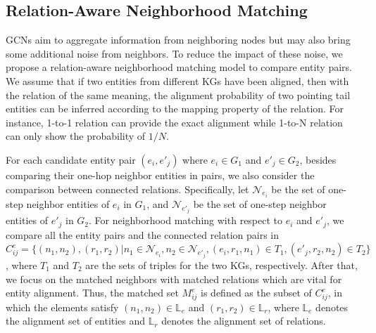 \documentclass[letterpaper]{article} %
\begin{document}
\subsection{Relation-Aware Neighborhood Matching}

GCNs aim to aggregate information from neighboring nodes but may
also bring some additional noise from neighbors. To reduce the
impact of these noise, we propose a relation-aware neighborhood
matching model to compare entity pairs. We assume that if two
entities from different KGs have been aligned, then with the
relation of the same meaning, the alignment probability of two
pointing tail entities can be inferred according to the mapping
property of the relation. For instance, 1-to-1 relation can provide
the exact alignment while 1-to-N relation can only show the
probability of $1/N$.


For each candidate entity pair $(e_i, e'_j)$ where $e_i \in G_1$ and
$e'_j \in G_2$, besides comparing their one-hop neighbor entities in
pairs, we also consider the comparison between connected relations.
Specifically, let $\mathcal{N}_{e_i}$ be the set of one-step
neighbor entities of $e_i$ in $G_1$, and $\mathcal{N}_{e'_j}$ be the
set of one-step neighbor entities of $e'_j$ in $G_2$. For
neighborhood matching with respect to $e_i$ and $e'_j$, we compare
all the entity pairs and the connected relation pairs in $C^e_{ij} =
\{ (n_1,n_2), (r_1,r_2) | n_1 \in \mathcal{N}_{e_i}, n_2 \in
\mathcal{N}_{e'_j}, (e_i, r_1, n_1) \in T_1, (e'_j, r_2, n_2) \in
T_2 \}$, where $T_1$ and $T_2$ are the sets of triples for the two
KGs, respectively. After that, we focus on the matched neighbors
with matched relations which are vital for entity alignment. Thus,
the matched set $M^e_{ij}$ is defined as the subset of $C^e_{ij}$,
in which the elements satisfy $(n_1,n_2) \in \mathbb{L}_e$ and
$(r_1,r_2) \in \mathbb{L}_r$, where $\mathbb{L}_e$ denotes the
alignment set of entities and $\mathbb{L}_r$ denotes the
alignment set of relations.
\end{document}

